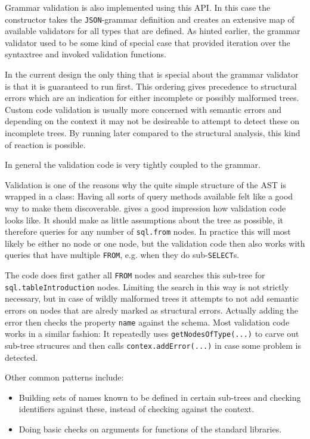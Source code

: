 \documentclass[]{report}
\begin{document}
Grammar validation is also implemented using this API. In this case the constructor takes the \texttt{JSON}-grammar definition and creates an extensive map of available validators for all types that are defined. As hinted earlier, the grammar validator used to be some kind of special case that provided iteration over the syntaxtree and invoked validation functions.

In the current design the only thing that is special about the grammar validator is that it is guaranteed to run first. This ordering gives precedence to structural errors which are an indication for either incomplete or possibly malformed trees. Custom code validation is usually more concerned with semantic errors and depending on the context it may not be desireable to attempt to detect these on incomplete trees. By running later compared to the structural analysis, this kind of reaction is possible.

In general the validation code is very tightly coupled to the grammar.

Validation is one of the reasons why the quite simple structure of the AST is wrapped in a class: Having all sorts of query methods available felt like a good way to make them discoverable.  gives a good impression how validation code looks like. It should make as little assumptions about the tree as possible, it therefore queries for any number of \texttt{sql.from} nodes. In practice this will most likely be either no node or one node, but the validation code then also works with queries that have multiple \texttt{FROM}, e.g. when they do sub-\texttt{SELECT}s.

The code does first gather all \texttt{FROM} nodes and searches this sub-tree for \texttt{sql.tableIntroduction} nodes. Limiting the search in this way is not strictly necessary, but in case of wildly malformed trees it attempts to not add semantic errors on nodes that are alredy marked as structural errors. Actually adding the error then checks the property \texttt{name} against the schema. Most validation code works in a similar fashion: It repeatedly uses \texttt{getNodesOfType(...)} to carve out sub-tree strucures and then calls \texttt{contex.addError(...)} in case some problem is detected.

Other common patterns include:

\begin{itemize}
\item Building sets of names known to be defined in certain sub-trees and checking identifiers against these, instead of checking against the context.
\item Doing basic checks on arguments for functions of the standard libraries.
\end{itemize}
\end{document}
